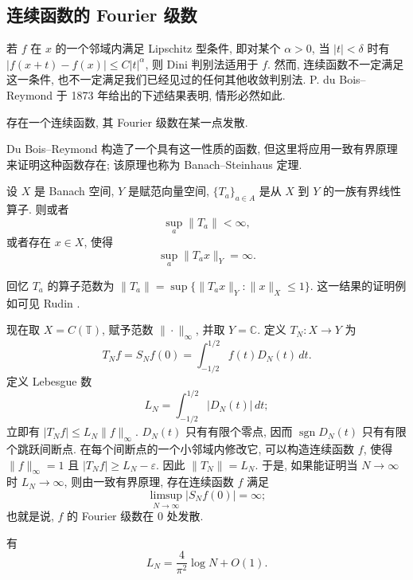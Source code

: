 \subsection{连续函数的 Fourier 级数}
\label{sec:ch1-continuous-fourier-series}

若 $f$ 在 $x$ 的一个邻域内满足 Lipschitz 型条件, 即对某个 $\alpha>0$, 当 $|t|<\delta$ 时有 $|f(x+t)-f(x)|\le C|t|^\alpha$, 则 Dini 判别法适用于 $f$. 然而, 连续函数不一定满足这一条件, 也不一定满足我们已经见过的任何其他收敛判别法. P. du Bois--Reymond 于 1873 年给出的下述结果表明, 情形必然如此.

\begin{Theorem}
\label{thm:ch1-continuous-fourier-divergence}
存在一个连续函数, 其 Fourier 级数在某一点发散.
\end{Theorem}

Du Bois--Reymond 构造了一个具有这一性质的函数, 但这里将应用一致有界原理来证明这种函数存在; 该原理也称为 Banach--Steinhaus 定理.

\begin{Lemma}[一致有界原理]
\label{lem:ch1-uniform-boundedness}
设 $X$ 是 Banach 空间, $Y$ 是赋范向量空间, $\{T_a\}_{a\in A}$ 是从 $X$ 到 $Y$ 的一族有界线性算子. 则或者
\[
 \sup_a\|T_a\|<\infty,
\]
或者存在 $x\in X$, 使得
\[
 \sup_a\|T_ax\|_Y=\infty.
\]
\end{Lemma}

\hypertarget{chapter-01-page-019}{}
回忆 $T_a$ 的算子范数为 $\|T_a\|=\sup\{\|T_ax\|_Y:\|x\|_X\le1\}$. 这一结果的证明例如可见 Rudin .

现在取 $X=C(\mathbb T)$, 赋予范数 $\|\cdot\|_\infty$, 并取 $Y=\mathbb C$. 定义 $T_N:X\to Y$ 为
\[
 T_Nf=S_Nf(0)=\int_{-1/2}^{1/2}f(t)D_N(t)\,dt.
\]
定义 Lebesgue 数
\[
 L_N=\int_{-1/2}^{1/2}|D_N(t)|\,dt;
\]
立即有 $|T_Nf|\le L_N\|f\|_\infty$. $D_N(t)$ 只有有限个零点, 因而 $\operatorname{sgn}D_N(t)$ 只有有限个跳跃间断点. 在每个间断点的一个小邻域内修改它, 可以构造连续函数 $f$, 使得 $\|f\|_\infty=1$ 且 $|T_Nf|\ge L_N-\varepsilon$. 因此 $\|T_N\|=L_N$. 于是, 如果能证明当 $N\to\infty$ 时 $L_N\to\infty$, 则由一致有界原理, 存在连续函数 $f$ 满足
\[
 \limsup_{N\to\infty}|S_Nf(0)|=\infty;
\]
也就是说, $f$ 的 Fourier 级数在 $0$ 处发散.

\begin{Lemma}
\label{lem:ch1-lebesgue-number-asymptotic}
有
\[
 L_N=\frac4{\pi^2}\log N+O(1).
\]
\end{Lemma}

